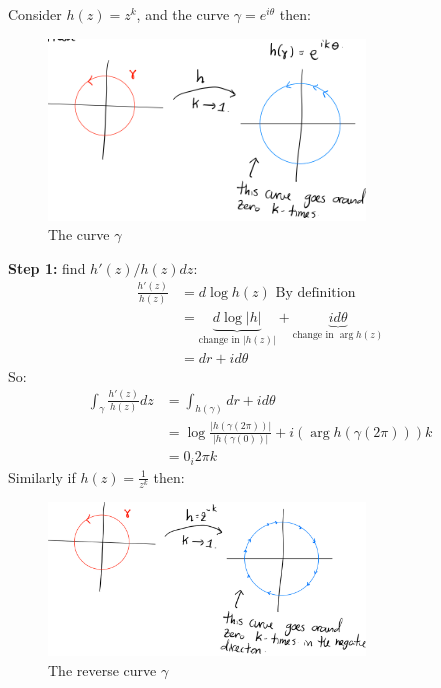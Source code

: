 \begin{example}
    Consider $h(z) = z^k$, and the curve $\gamma = e^{i\theta}$ then:
    \begin{figure}[H]
        \centering
        \includegraphics[width=0.75\textwidth]{LECTURE_13/gamma.png}
        \caption{The curve $\gamma$}
    \end{figure}

    \textbf{Step 1:} find $h'(z)/h(z)dz$:
    \begin{align*}
        \frac{h'(z)}{h(z)} & = d\log h(z) \text{ By definition}                                                                     \\
                           & = \underbrace{d\log|h|}_{\text{change in }|h(z)|} + \underbrace{id\theta}_{\text{change in }\arg h(z)} \\
                           & = dr + id\theta
    \end{align*}
    So:
    \begin{align*}
        \int_{\gamma} \frac{h'(z)}{h(z)}dz & = \int_{h(\gamma)} dr + id\theta                                          \\
                                           & = \log\frac{|h(\gamma(2\pi))|}{|h(\gamma(0))|} + i(\arg h(\gamma(2\pi)))k \\
                                           & = 0 _ i2\pi k
    \end{align*}
    Similarly if $h(z) = \frac{1}{z^k}$ then:
    \begin{figure}[H]
        \centering
        \includegraphics[width=0.75\textwidth]{LECTURE_13/gamma_rev.png}
        \caption{The reverse curve $\gamma$}
    \end{figure}

\end{example}

